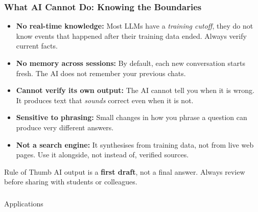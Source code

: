 \begin{frame}[fragile]\frametitle{What AI Cannot Do: Knowing the Boundaries}

\begin{itemize}
    \item \textbf{No real-time knowledge:} Most LLMs have a \emph{training cutoff}, they do not know events that happened after their training data ended. Always verify current facts.
    \item \textbf{No memory across sessions:} By default, each new conversation starts fresh. The AI does not remember your previous chats.
    \item \textbf{Cannot verify its own output:} The AI cannot tell you when it is wrong. It produces text that \emph{sounds} correct even when it is not.
    \item \textbf{Sensitive to phrasing:} Small changes in how you phrase a question can produce very different answers.
    \item \textbf{Not a search engine:} It synthesises from training data, not from live web pages. Use it alongside, not instead of, verified sources.
\end{itemize}

\medskip
\begin{alertblock}{Rule of Thumb}
AI output is a \textbf{first draft}, not a final answer. Always review before sharing with students or colleagues.
\end{alertblock}

\end{frame}


\begin{frame}[fragile]\frametitle{}
\begin{center}
{\Large Applications}
\end{center}
\end{frame}

